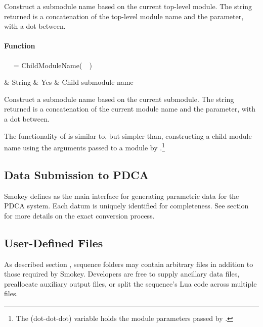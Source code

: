 Construct a submodule name based on the current top-level module.  The string
returned is a concatenation of the top-level module name and the
 parameter, with a dot between.

\paragraph{ Function}

\begin{minipage}{\linewidth}
\begin{SmokeyApi}
~~ = ChildModuleName(~~)
\end{SmokeyApi}

\begin{ApiTable}
	 & String & Yes & Child submodule name \\
\end{ApiTable}
\end{minipage}

Construct a submodule name based on the current submodule.  The string returned
is a concatenation of the current module name and the 
parameter, with a dot between.

The functionality of  is similar to, but simpler than,
constructing a child module name using the arguments passed to a module by
.\footnote{The  (dot-dot-dot) variable holds the
module parameters passed by .}

\subsection{Data Submission to PDCA}

Smokey defines  as the main interface for generating
parametric data for the PDCA system.  Each datum is uniquely identified for
completeness.  See section  for more
details on the exact conversion process.

\subsection{User-Defined Files}

As described section , sequence folders may
contain arbitrary files in addition to those required by Smokey.  Developers
are free to supply ancillary data files, preallocate auxiliary output files, or
split the sequence's Lua code across multiple files.

